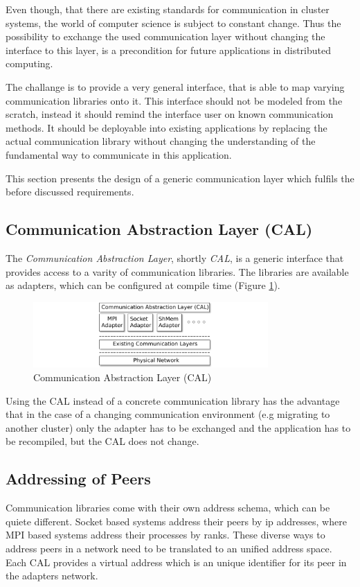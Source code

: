 Even though, that there are existing standards for communication in
cluster systems, the world of computer science is subject to constant
change. Thus the possibility to exchange the used communication layer
without changing the interface to this layer, is a precondition for
future applications in distributed computing.

The challange is to provide a very general interface, that is able to
map varying communication libraries onto it. This interface should not
be modeled from the scratch, instead it should remind the interface
user on known communication methods. It should be deployable into existing
applications by replacing the actual communication library without
changing the understanding of the fundamental way to communicate in
this application.

This section presents the design of a generic communication layer
which fulfils the before discussed requirements.

\subsection{Communication Abstraction Layer (CAL)}
The \textit{Communication Abstraction Layer}, shortly \textit{CAL}, is
a generic interface that provides access to a varity of communication
libraries. The libraries are available as adapters, which can be
configured at compile time (Figure \ref{fig:cal}).

\begin{figure}[H]
  \centering \includegraphics[width=0.8\textwidth]{graphics/30_cal}
  \caption{Communication Abstraction Layer (CAL)}
  \label{fig:cal}
\end{figure}

Using the CAL instead of a concrete communication library has the
advantage that in the case of a changing communication environment
(e.g migrating to another cluster) only the adapter has to be
exchanged and the application has to be recompiled, but the CAL does
not change.

\subsection{Addressing of Peers}
Communication libraries come with their own address schema, which can
be quiete different. Socket based systems address their peers by ip
addresses, where MPI based systems address their processes by ranks.
These diverse ways to address peers in a network need to be translated
to an unified address space. Each CAL provides a virtual address
which is an unique identifier for its peer in the adapters network.

